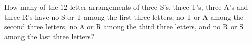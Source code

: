 How many of the $12$-letter arrangements of three S's, three T's, three A's and three R's have no S or T among the first three letters, no T or A among the second three letters, no A or R among the third three letters, and no R or S among the last three letters?
